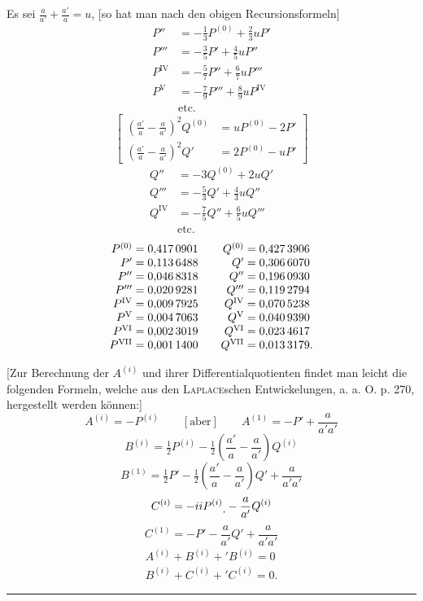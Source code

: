 Es sei \(\frac a{a'}+\frac{a'}a=u\), [so hat man nach den obigen Recursionsformeln]
\[
\begin{aligned}
P''&=-\tfrac13P^{(0)}+\tfrac23uP'\\
P'''&=-\tfrac35P'+\tfrac45uP''\\
P^{\mathrm{IV}}&=-\tfrac57P''+\tfrac67uP'''\\
P^{\mathrm{V}}&=-\tfrac79P'''+\tfrac89uP^{\mathrm{IV}}\\
&\text{etc.}
\end{aligned}
\]
\[
\left[\begin{aligned}
\left(\frac{a'}a-\frac a{a'}\right)^2Q^{(0)}&=uP^{(0)}-2P'\\
\left(\frac{a'}a-\frac a{a'}\right)^2Q'&=2P^{(0)}-uP'
\end{aligned}\right]
\]
\[
\begin{aligned}
Q''&=-3Q^{(0)}+2uQ'\\
Q'''&=-\tfrac53Q'+\tfrac43uQ''\\
Q^{\mathrm{IV}}&=-\tfrac75Q''+\tfrac65uQ'''\\
&\text{etc.}
\end{aligned}
\]
\hypertarget{native-392}{}
\[
\begin{array}{r@{\;}l@{\qquad}r@{\;}l}
P^{(0)}&=0{,}417\,0901&Q^{(0)}&=0{,}427\,3906\\
P'&=0{,}113\,6488&Q'&=0{,}306\,6070\\
P''&=0{,}046\,8318&Q''&=0{,}196\,0930\\
P'''&=0{,}020\,9281&Q'''&=0{,}119\,2794\\
P^{\mathrm{IV}}&=0{,}009\,7925&Q^{\mathrm{IV}}&=0{,}070\,5238\\
P^{\mathrm{V}}&=0{,}004\,7063&Q^{\mathrm{V}}&=0{,}040\,9390\\
P^{\mathrm{VI}}&=0{,}002\,3019&Q^{\mathrm{VI}}&=0{,}023\,4617\\
P^{\mathrm{VII}}&=0{,}001\,1400&Q^{\mathrm{VII}}&=0{,}013\,3179.
\end{array}
\]

[Zur Berechnung der \(A^{(i)}\) und ihrer Differentialquotienten findet man leicht die folgenden Formeln, welche aus den \textsc{Laplace}schen Entwickelungen, a. a. O. p. 270, hergestellt werden können:]
\[
A^{(i)}=-P^{(i)}\qquad[\text{aber}]\qquad A^{(1)}=-P'+\frac a{a'a'}
\]
\[
B^{(i)}=\tfrac12P^{(i)}-\tfrac12\left(\frac{a'}a-\frac a{a'}\right)Q^{(i)}
\]
\[
B^{(1)}=\tfrac12P'-\tfrac12\left(\frac{a'}a-\frac a{a'}\right)Q'+\frac a{a'a'}
\]
\[
C^{(i)}=-iiP^{(i)}\mathord{\text{\raisebox{-.6ex}{.}}}-\frac a{a'}Q^{(i)}
\]
\[
C^{(1)}=-P'-\frac a{a'}Q'+\frac a{a'a'}
\]
\[
\begin{gathered}
A^{(i)}+B^{(i)}+{}'B^{(i)}=0\\
B^{(i)}+C^{(i)}+{}'C^{(i)}=0.
\end{gathered}
\]
\begin{center}\rule{.18\linewidth}{.3pt}\end{center}
